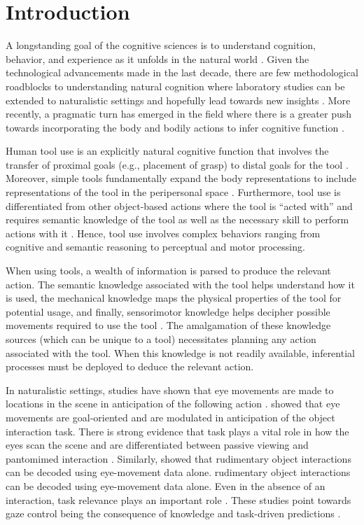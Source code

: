 \section{Introduction}

A longstanding goal of the cognitive sciences is to understand cognition, behavior, and experience as it unfolds in the natural world \citep{Parada2020-qq}. Given the technological advancements made in the last decade, there are few methodological roadblocks to understanding natural cognition where laboratory studies can be extended to naturalistic settings and hopefully lead towards new insights \citep{Ladouce2016-li, Parada2018-vf}. More recently, a pragmatic turn has emerged in the field where there is a greater push towards incorporating the body and bodily actions to infer cognitive function \citep{Engel2013-bx}. 

Human tool use is an explicitly natural cognitive function that involves the transfer of proximal goals (e.g., placement of grasp) to distal goals for the tool \citep{Arbib2009-wa}.  Moreover, simple tools fundamentally expand the body representations to include representations of the tool in the peripersonal space \citep{Berti2000-ap, Farne2005-ns, Maravita2002-sq}. Furthermore, tool use is differentiated from other object-based actions where the tool is “acted with” \citep{Johnson2003-ee} and requires semantic knowledge of the tool as well as the necessary skill to perform actions with it \citep{Johnson-Frey2004-qk}. Hence, tool use involves complex behaviors ranging from cognitive and semantic reasoning to perceptual and motor processing.

When using tools, a wealth of information is parsed to produce the relevant action. The semantic knowledge associated with the tool helps understand how it is used, the mechanical knowledge maps the physical properties of the tool for potential usage, and finally, sensorimotor knowledge helps decipher possible movements required to use the tool \citep{Baumard2014-kv}. The amalgamation of these knowledge sources (which can be unique to a tool) necessitates planning any action associated with the tool. When this knowledge is not readily available, inferential processes must be deployed to deduce the relevant action. 

In naturalistic settings, studies have shown that eye movements are made to locations in the scene in anticipation of the following action \citep{Hayhoe2004-ni, Land2001-do, Pelz2001-cn}. \citet{Belardinelli2016-kf}  showed that eye movements are goal-oriented and are modulated in anticipation of the object interaction task. There is strong evidence that task plays a vital role in how the eyes scan the scene and are differentiated between passive viewing and pantomimed interaction \citep{Belardinelli2015-in}. Similarly, \citet{Keshava2020-cp} showed that rudimentary object interactions can be decoded using eye-movement data alone. rudimentary object interactions can be decoded using eye-movement data alone. Even in the absence of an interaction, task relevance plays an important role \citep{Castelhano2009-px, Henderson2017-it}. These studies point towards gaze control being the consequence of knowledge and task-driven predictions \citep{Henderson2017-tx}.

